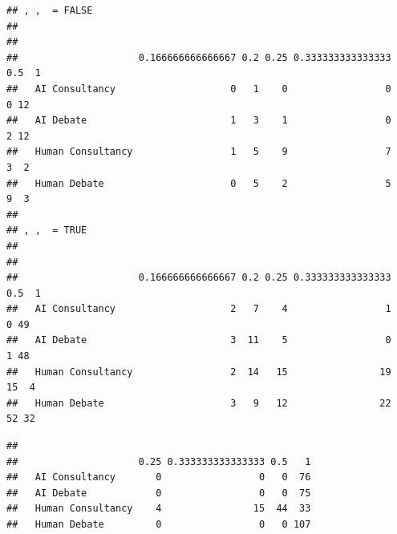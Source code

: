 \documentclass[
]{article}
\newenvironment{Shaded}{\begin{snugshade}}{\end{snugshade}}
\newcommand{\CommentTok}[1]{\textcolor[rgb]{0.56,0.35,0.01}{\textit{#1}}}
\newcommand{\ConstantTok}[1]{\textcolor[rgb]{0.56,0.35,0.01}{#1}}
\newcommand{\FunctionTok}[1]{\textcolor[rgb]{0.13,0.29,0.53}{\textbf{#1}}}
\newcommand{\NormalTok}[1]{#1}
\newcommand{\SpecialCharTok}[1]{\textcolor[rgb]{0.81,0.36,0.00}{\textbf{#1}}}
\begin{document}
\begin{verbatim}
## , ,  = FALSE
## 
##                    
##                     0.166666666666667 0.2 0.25 0.333333333333333 0.5  1
##   AI Consultancy                    0   1    0                 0   0 12
##   AI Debate                         1   3    1                 0   2 12
##   Human Consultancy                 1   5    9                 7   3  2
##   Human Debate                      0   5    2                 5   9  3
## 
## , ,  = TRUE
## 
##                    
##                     0.166666666666667 0.2 0.25 0.333333333333333 0.5  1
##   AI Consultancy                    2   7    4                 1   0 49
##   AI Debate                         3  11    5                 0   1 48
##   Human Consultancy                 2  14   15                19  15  4
##   Human Debate                      3   9   12                22  52 32
\end{verbatim}

\begin{Shaded}
\end{Shaded}

\begin{verbatim}
##                    
##                     0.25 0.333333333333333 0.5   1
##   AI Consultancy       0                 0   0  76
##   AI Debate            0                 0   0  75
##   Human Consultancy    4                15  44  33
##   Human Debate         0                 0   0 107
\end{verbatim}

\begin{Shaded}
\end{Shaded}
\end{document}
